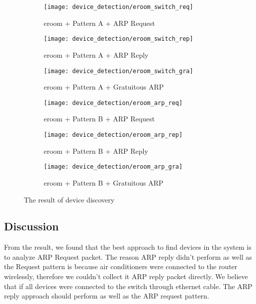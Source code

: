 \begin{figure}[H]
    \centering
    \begin{subfigure}[b]{0.25\textwidth}
        \centering
        \texttt{[image: device\_detection/eroom\_switch\_req]}
        \caption{eroom + Pattern A + ARP Request}
        \label{fig:s4_eroom_a_req}
    \end{subfigure}
    \hfill
    \begin{subfigure}[b]{0.25\textwidth}
        \centering
        \texttt{[image: device\_detection/eroom\_switch\_rep]}
        \caption{eroom + Pattern A + ARP Reply}
        \label{fig:s4_eroom_a_rep}
    \end{subfigure}
    \hfill
    \begin{subfigure}[b]{0.25\textwidth}
        \centering
        \texttt{[image: device\_detection/eroom\_switch\_gra]}
        \caption{eroom + Pattern A + Gratuitous ARP}
        \label{fig:s4_errom_a_gra}
    \end{subfigure}
    \newline 
    \begin{subfigure}[b]{0.25\textwidth}
        \centering
        \texttt{[image: device\_detection/eroom\_arp\_req]}
        \caption{eroom + Pattern B + ARP Request}
        \label{fig:s4_10f_b_req}
    \end{subfigure}
    \hfill
    \begin{subfigure}[b]{0.25\textwidth}
        \centering
        \texttt{[image: device\_detection/eroom\_arp\_rep]}
        \caption{eroom + Pattern B + ARP Reply}
        \label{fig:s4_eroom_b_rep}
    \end{subfigure}
    \hfill
    \begin{subfigure}[b]{0.25\textwidth}
        \centering
        \texttt{[image: device\_detection/eroom\_arp\_gra]}
        \caption{eroom + Pattern B + Gratuitous ARP}
        \label{fig:s4_eroom_b_gra}
    \end{subfigure}

    \caption{The result of device discovery}
    \label{fig:s4_device_discovery_result}
\end{figure}

\subsection{Discussion}
From the result, we found that the best approach to find devices in the system is to analyze ARP Request packet. 
The reason ARP reply didn’t perform as well as the Request pattern is because air conditioners were connected to the router wirelessly,
 therefore we couldn’t collect it ARP reply packet directly. We believe that if all devices were connected to the switch through ethernet cable. The ARP reply approach should perform as well as the ARP request pattern.  
 
